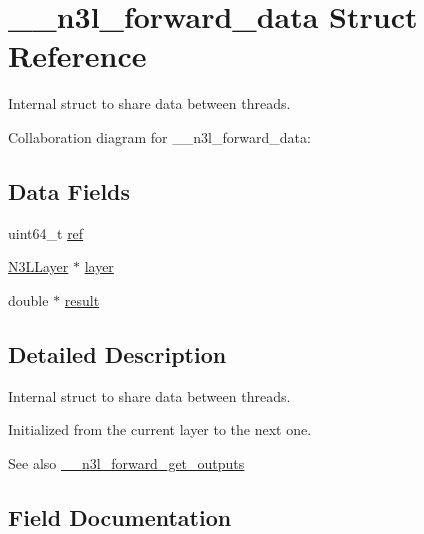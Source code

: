 \hypertarget{struct____n3l__forward__data}{}\section{\+\_\+\+\_\+n3l\+\_\+forward\+\_\+data Struct Reference}
\label{struct____n3l__forward__data}


Internal struct to share data between threads.  




Collaboration diagram for \+\_\+\+\_\+n3l\+\_\+forward\+\_\+data\+:
\subsection*{Data Fields}
\begin{DoxyCompactItemize}
\item 
uint64\+\_\+t \mbox{\hyperlink{struct____n3l__forward__data_ada78b9bd1418f8dccab76319afb7d64b}{ref}}
\item 
\mbox{\hyperlink{struct__n3l__layer}{N3\+L\+Layer}} $\ast$ \mbox{\hyperlink{struct____n3l__forward__data_aaeb45910cc54c7f3a770dbd124477fc2}{layer}}
\item 
double $\ast$ \mbox{\hyperlink{struct____n3l__forward__data_ac870eae5ce14b297b5d78cc7112c8cec}{result}}
\end{DoxyCompactItemize}


\subsection{Detailed Description}
Internal struct to share data between threads. 

Initialized from the current layer to the next one.

\begin{DoxySeeAlso}{See also}
\mbox{\hyperlink{n3__forward_8c_ac55d957c2a3b754387f5037e87317870}{\+\_\+\+\_\+n3l\+\_\+forward\+\_\+get\+\_\+outputs}} 
\end{DoxySeeAlso}


\subsection{Field Documentation}
\mbox{\label{struct____n3l__forward__data_aaeb45910cc54c7f3a770dbd124477fc2}} 
